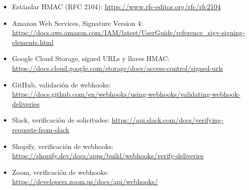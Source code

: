 \documentclass[11pt,a4paper]{article}
\begin{document}
\begin{itemize}[leftmargin=*]
    \item Estándar HMAC (RFC 2104): \url{https://www.rfc-editor.org/rfc/rfc2104}
    \item Amazon Web Services, Signature Version 4: \url{https://docs.aws.amazon.com/IAM/latest/UserGuide/reference_sigv-signing-elements.html}
    \item Google Cloud Storage, signed URLs y llaves HMAC: \url{https://docs.cloud.google.com/storage/docs/access-control/signed-urls}
    \item GitHub, validación de webhooks: \url{https://docs.github.com/en/webhooks/using-webhooks/validating-webhook-deliveries}
    \item Slack, verificación de solicitudes: \url{https://api.slack.com/docs/verifying-requests-from-slack}
    \item Shopify, verificación de webhooks: \url{https://shopify.dev/docs/apps/build/webhooks/verify-deliveries}
    \item Zoom, verificación de webhooks: \url{https://developers.zoom.us/docs/api/webhooks/}
\end{itemize}
\end{document}

